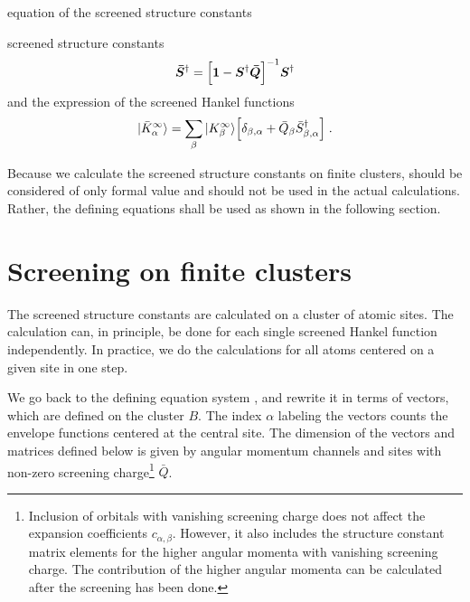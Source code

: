 \documentclass[11pt,a4paper]{report}
\begin{document}
equation of the screened structure constants
\begin{myshadowminipage}{screened structure constants}
\begin{eqnarray}
\bm{\bar{S}}^\dagger=
\Bigl[\bm{1}-\bm{S}^\dagger\bm{\bar{Q}}\Bigr]^{-1}\bm{S}^\dagger
\label{eq:defscreenedstructureconstants}
\end{eqnarray}
and the expression of the screened Hankel functions 
\begin{eqnarray}
|\bar{K}^\infty_\alpha\rangle=\sum_\beta |K^\infty_\beta\rangle
\Bigl[\delta_{\beta,\alpha}+
\bar{Q}_\beta \bar{S}^\dagger_{\beta,\alpha}\Bigr]
\;.
\end{eqnarray}

Because we calculate the screened structure constants on finite
clusters,  should be considered
of only formal value and should not be used in the actual
calculations. Rather, the defining equations
 shall be used as shown in the
following section.
\end{myshadowminipage}{}


\section{Screening on finite clusters}
The screened structure constants are calculated on a cluster of atomic
sites. The calculation can, in principle, be done for each single
screened Hankel function independently. In practice, we do the
calculations for all atoms centered on a given site in one step.

We go back to the defining equation system
,  and
rewrite it in terms of vectors, which are defined on the cluster
$B$. The index $\alpha$ labeling the vectors counts the envelope
functions centered at the central site. The dimension of the vectors
and matrices defined below is given by angular momentum channels and
sites with non-zero screening charge\footnote{Inclusion of orbitals
  with vanishing screening charge does not affect the expansion
  coefficients $c_{\alpha,\beta}$. However, it also includes the
  structure constant matrix elements for the higher angular momenta
  with vanishing screening charge. The contribution of the higher
  angular momenta can be calculated after the screening has been
  done.} $\bar{Q}$.
\end{document}
